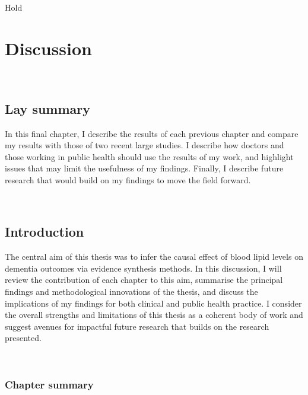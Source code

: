 \documentclass[a4paper, twoside]{templates/ociamthesis}
\begin{document}
\begin{savequote}
Hold
\end{savequote}



\hypertarget{discussion-heading}{%
\chapter{Discussion}\label{discussion-heading}}

~

\minitoc 

\newpage

\begin{laybox}

\hypertarget{lay-summary-7}{%
\section{Lay summary}\label{lay-summary-7}}

In this final chapter, I describe the results of each previous chapter and compare my results with those of two recent large studies. I describe how doctors and those working in public health should use the results of my work, and highlight issues that may limit the usefulness of my findings. Finally, I describe future research that would build on my findings to move the field forward.

\end{laybox}

~

\hypertarget{introduction-4}{%
\section{Introduction}\label{introduction-4}}

The central aim of this thesis was to infer the causal effect of blood lipid levels on dementia outcomes via evidence synthesis methods. In this discussion, I will review the contribution of each chapter to this aim, summarise the principal findings and methodological innovations of the thesis, and discuss the implications of my findings for both clinical and public health practice. I consider the overall strengths and limitations of this thesis as a coherent body of work and suggest avenues for impactful future research that builds on the research presented.

~

\hypertarget{chapter-summary}{%
\subsection{Chapter summary}\label{chapter-summary}}
\end{document}
